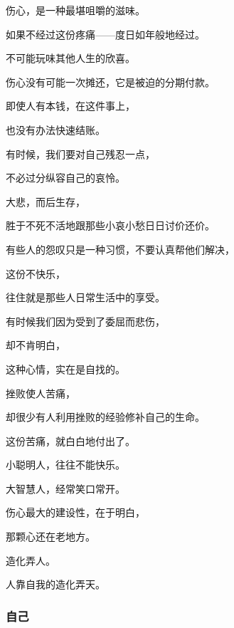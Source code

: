 \par 伤心，是一种最堪咀嚼的滋味。
\par 如果不经过这份疼痛——度日如年般地经过。
\par 不可能玩味其他人生的欣喜。
\par 
\par 伤心没有可能一次摊还，它是被迫的分期付款。
\par 即使人有本钱，在这件事上，
\par 也没有办法快速结账。
\par 
\par 有时候，我们要对自己残忍一点，
\par 不必过分纵容自己的哀怜。
\par 大悲，而后生存，
\par 胜于不死不活地跟那些小哀小愁日日讨价还价。
\par 
\par 有些人的怨叹只是一种习惯，不要认真帮他们解决，
\par 这份不快乐，
\par 往住就是那些人日常生活中的享受。
\par 
\par 有时候我们因为受到了委屈而悲伤，
\par 却不肯明白，
\par 这种心情，实在是自找的。
\par 
\par 挫败使人苦痛，
\par 却很少有人利用挫败的经验修补自己的生命。
\par 这份苦痛，就白白地付出了。
\par 
\par 小聪明人，往往不能快乐。
\par 大智慧人，经常笑口常开。
\par 
\par 伤心最大的建设性，在于明白，
\par 那颗心还在老地方。
\par 
\par 造化弄人。
\par 人靠自我的造化弄天。




\subsubsection{自己}


